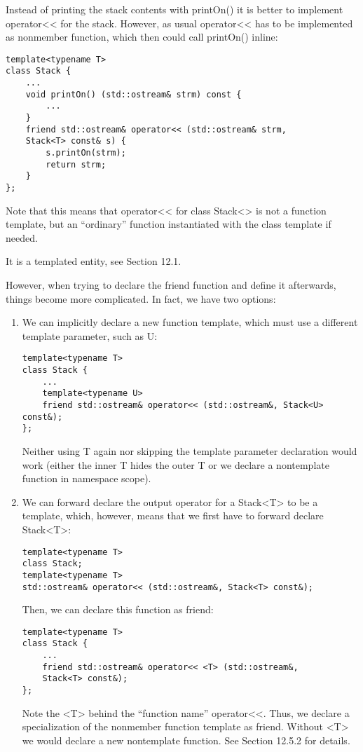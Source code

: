 
Instead of printing the stack contents with printOn() it is better to implement operator<< for the stack. However, as usual operator<< has to be implemented as nonmember function, which then could call printOn() inline:

\begin{lstlisting}[style=styleCXX]
template<typename T>
class Stack {
	...
	void printOn() (std::ostream& strm) const {
		...
	}
	friend std::ostream& operator<< (std::ostream& strm,
	Stack<T> const& s) {
		s.printOn(strm);
		return strm;
	}
};
\end{lstlisting}

Note that this means that operator<< for class Stack<> is not a function template, but an “ordinary” function instantiated with the class template if needed.

\begin{tcolorbox}[colback=webgreen!5!white,colframe=webgreen!75!black]
\hspace*{0.75cm}It is a templated entity, see Section 12.1.
\end{tcolorbox}

However, when trying to declare the friend function and define it afterwards, things become more complicated. In fact, we have two options:

\begin{enumerate}
\item 
We can implicitly declare a new function template, which must use a different template parameter, such as U:

\begin{lstlisting}[style=styleCXX]
template<typename T>
class Stack {
	...
	template<typename U>
	friend std::ostream& operator<< (std::ostream&, Stack<U> const&);
};
\end{lstlisting}

Neither using T again nor skipping the template parameter declaration would work (either the inner T hides the outer T or we declare a nontemplate function in namespace scope).

\item 
We can forward declare the output operator for a Stack<T> to be a template, which, however, means that we first have to forward declare Stack<T>:

\begin{lstlisting}[style=styleCXX]
template<typename T>
class Stack;
template<typename T>
std::ostream& operator<< (std::ostream&, Stack<T> const&);
\end{lstlisting}

Then, we can declare this function as friend:

\begin{lstlisting}[style=styleCXX]
template<typename T>
class Stack {
	...
	friend std::ostream& operator<< <T> (std::ostream&,
	Stack<T> const&);
};
\end{lstlisting}

Note the <T> behind the “function name” operator<<. Thus, we declare a specialization of the nonmember function template as friend. Without <T> we would declare a new nontemplate function. See Section 12.5.2 for details.
\end{enumerate}

